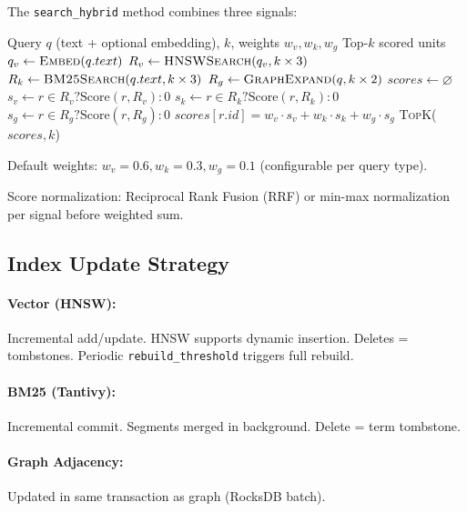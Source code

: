The \texttt{search\_hybrid} method combines three signals:

\begin{algorithm}[H]
\caption{Hybrid Search}
\label{alg:hybrid-search}
\begin{algorithmic}[1]
\Require Query $q$ (text + optional embedding), $k$, weights $w_v, w_k, w_g$
\Ensure Top-$k$ scored units
\State $q_v \gets \textsc{Embed}(q.text)$ 
\State $R_v \gets \textsc{HNSWSearch}(q_v, k \times 3)$
\State $R_k \gets \textsc{BM25Search}(q.text, k \times 3)$
\State $R_g \gets \textsc{GraphExpand}(q, k \times 2)$ 
\State $scores \gets \varnothing$
  \State $s_v \gets r \in R_v ? \text{Score}(r, R_v) : 0$
  \State $s_k \gets r \in R_k ? \text{Score}(r, R_k) : 0$
  \State $s_g \gets r \in R_g ? \text{Score}(r, R_g) : 0$
  \State $scores[r.id] = w_v \cdot s_v + w_k \cdot s_k + w_g \cdot s_g$
\EndFor
\State \Return \textsc{TopK}($scores, k$)
\end{algorithmic}
\end{algorithm}

Default weights: $w_v=0.6, w_k=0.3, w_g=0.1$ (configurable per query type).

Score normalization: Reciprocal Rank Fusion (RRF) or min-max normalization per signal before weighted sum.

\subsection{Index Update Strategy}
\label{sec:kg:index-update}

\paragraph{Vector (HNSW):} Incremental add/update. HNSW supports dynamic insertion. Deletes = tombstones. Periodic \texttt{rebuild\_threshold} triggers full rebuild.

\paragraph{BM25 (Tantivy):} Incremental commit. Segments merged in background. Delete = term tombstone.

\paragraph{Graph Adjacency:} Updated in same transaction as graph (RocksDB batch).

